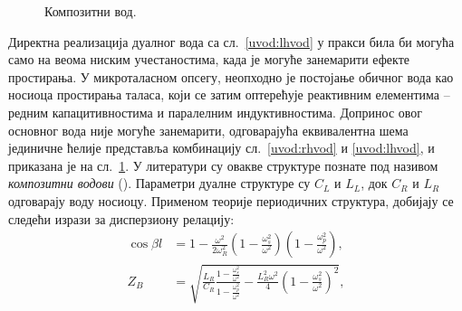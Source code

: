 \documentclass[12pt,oneside]{book}
\begin{document}
\begin{figure}[h]
    \centering
    \caption{Композитни вод.}
    \label{uvod:crlh}
\end{figure}
Директна реализација дуалног вода са сл.~\ref{uvod:lhvod} у пракси била би могућа само на веома ниским учестаностима, када је могуће занемарити ефекте простирања. У микроталасном опсегу, неопходно је постојање обичног вода као носиоца простирања таласа, који се затим оптерећује реактивним елементима -- редним капацитивностима и паралелним индуктивностима. Допринос овог основног вода није могуће занемарити, одговарајућа еквивалентна шема јединичне ћелије представља комбинацију сл.~\ref{uvod:rhvod} и \ref{uvod:lhvod}, и приказана је на сл.~\ref{uvod:crlh}. У литератури су овакве структуре познате под називом \emph{композитни водови} (). Параметри дуалне структуре су $C_L$ и $L_L$, док $C_R$ и $L_R$ одговарају воду носиоцу. Применом теорије периодичних структура, добијају се следећи изрази за дисперзиону релацију:
\begin{align}
    \cos{\beta l} & = 1 - \frac{\omega^2}{2\omega_R^2}\left( 1 - \frac{\omega_s^2}{\omega^2} \right)\left( 1 - \frac{\omega_p^2}{\omega^2} \right),\\
    Z_B & = \sqrt{\frac{L_R}{C_R}\frac{1-\frac{\omega_s^2}{\omega^2}}{1-\frac{\omega_p^2}{\omega^2}} - \frac{L_R^2\omega^2}{4}\left( 1 - \frac{\omega_s^2}{\omega^2} \right)^2},
\end{align}
\end{document}

